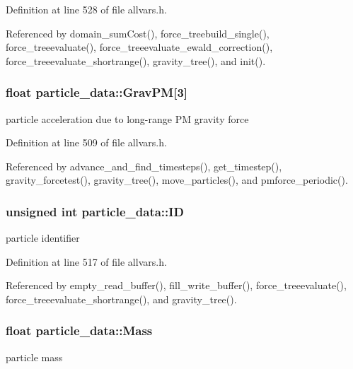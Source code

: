 Definition at line 528 of file allvars.h.



Referenced by domain\_\-sumCost(), force\_\-treebuild\_\-single(), force\_\-treeevaluate(), force\_\-treeevaluate\_\-ewald\_\-correction(), force\_\-treeevaluate\_\-shortrange(), gravity\_\-tree(), and init().

\hypertarget{structparticle__data_a66cad4fae4501e68c9be5f6c643a8798}{
\subsubsection[{GravPM}]{\setlength{\rightskip}{0pt plus 5cm}float {\bf particle\_\-data::GravPM}\mbox{[}3\mbox{]}}}
\label{structparticle__data_a66cad4fae4501e68c9be5f6c643a8798}
particle acceleration due to long-\/range PM gravity force 

Definition at line 509 of file allvars.h.



Referenced by advance\_\-and\_\-find\_\-timesteps(), get\_\-timestep(), gravity\_\-forcetest(), gravity\_\-tree(), move\_\-particles(), and pmforce\_\-periodic().

\hypertarget{structparticle__data_aefa92af245e44af30d28799ab1419e74}{
\subsubsection[{ID}]{\setlength{\rightskip}{0pt plus 5cm}unsigned int {\bf particle\_\-data::ID}}}
\label{structparticle__data_aefa92af245e44af30d28799ab1419e74}
particle identifier 

Definition at line 517 of file allvars.h.



Referenced by empty\_\-read\_\-buffer(), fill\_\-write\_\-buffer(), force\_\-treeevaluate(), force\_\-treeevaluate\_\-shortrange(), and gravity\_\-tree().

\hypertarget{structparticle__data_a710e551be01f4ef85442d0928aca728c}{
\subsubsection[{Mass}]{\setlength{\rightskip}{0pt plus 5cm}float {\bf particle\_\-data::Mass}}}
\label{structparticle__data_a710e551be01f4ef85442d0928aca728c}
particle mass 

